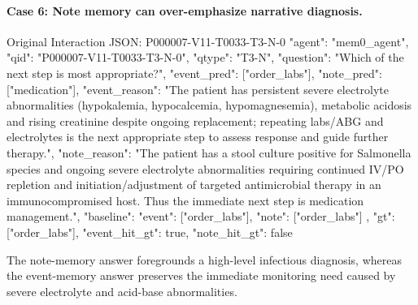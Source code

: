 \paragraph{Case 6: Note memory can over-emphasize narrative diagnosis.}
\begin{promptblock}{Original Interaction JSON: P000007-V11-T0033-T3-N-0}
{
  "agent": "mem0_agent",
  "qid": "P000007-V11-T0033-T3-N-0",
  "qtype": "T3-N",
  "question": "Which of the next step is most appropriate?",
  "event_pred": ["order_labs"],
  "note_pred": ["medication"],
  "event_reason": "The patient has persistent severe electrolyte abnormalities (hypokalemia, hypocalcemia, hypomagnesemia), metabolic acidosis and rising creatinine despite ongoing replacement; repeating labs/ABG and electrolytes is the next appropriate step to assess response and guide further therapy.",
  "note_reason": "The patient has a stool culture positive for Salmonella species and ongoing severe electrolyte abnormalities requiring continued IV/PO repletion and initiation/adjustment of targeted antimicrobial therapy in an immunocompromised host. Thus the immediate next step is medication management.",
  "baseline": {
    "event": ["order_labs"],
    "note": ["order_labs"]
  },
  "gt": ["order_labs"],
  "event_hit_gt": true,
  "note_hit_gt": false
}
\end{promptblock}

The note-memory answer foregrounds a high-level infectious diagnosis, whereas the event-memory answer preserves the immediate monitoring need caused by severe electrolyte and acid-base abnormalities.

